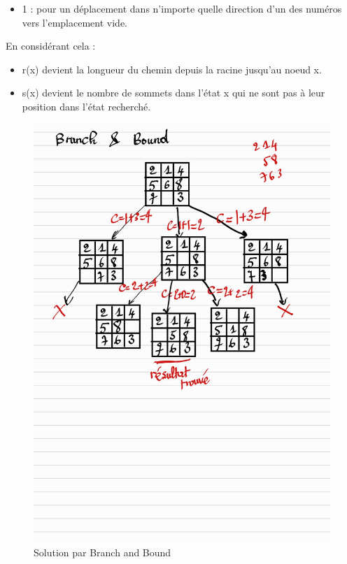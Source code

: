 \documentclass[a4paper]{article}
\begin{document}
\begin{itemize}
\item 1 : pour un déplacement dans n'importe quelle direction d'un des numéros vers l'emplacement vide.
\end{itemize}

En considérant cela :
\begin{itemize}
\item r(x) devient la longueur du chemin depuis la racine jusqu'au noeud x.
\item s(x) devient le nombre de sommets dans l'état x qui ne sont pas à leur position dans l'état recherché.
\end{itemize}





\begin{figure}[htbp]
\centering
\includegraphics[width=.9\linewidth]{./2.jpg}
\caption{Solution par Branch and Bound}
\end{figure}
\end{document}
